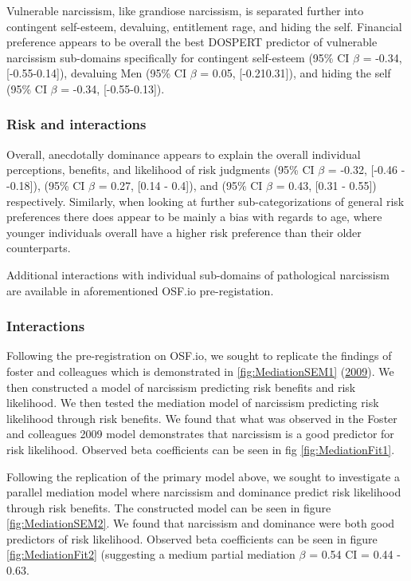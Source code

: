 \documentclass[
  donotrepeattitle,doc, 12pt, a4paper,floatsintext]{apa7}
\begin{document}
Vulnerable narcissism, like grandiose narcissism, is separated further into contingent self-esteem, devaluing, entitlement rage, and hiding the self. Financial preference appears to be overall the best DOSPERT predictor of vulnerable narcissism sub-domains specifically for contingent self-esteem (95\% CI \(\beta\) = -0.34, {[}-0.55-0.14{]}), devaluing Men (95\% CI \(\beta\) = 0.05, {[}-0.210.31{]}), and hiding the self (95\% CI \(\beta\) = -0.34, {[}-0.55-0.13{]}).

\hypertarget{risk-and-interactions}{%
\subsubsection{Risk and interactions}\label{risk-and-interactions}}

Overall, anecdotally dominance appears to explain the overall individual perceptions, benefits, and likelihood of risk judgments (95\% CI \(\beta\) = -0.32, {[}-0.46 - -0.18{]}), (95\% CI \(\beta\) = 0.27, {[}0.14 - 0.4{]}), and (95\% CI \(\beta\) = 0.43, {[}0.31 - 0.55{]}) respectively. Similarly, when looking at further sub-categorizations of general risk preferences there does appear to be mainly a bias with regards to age, where younger individuals overall have a higher risk preference than their older counterparts.

Additional interactions with individual sub-domains of pathological narcissism are available in aforementioned OSF.io pre-registation.

\hypertarget{interactions-1}{%
\subsubsection{Interactions}\label{interactions-1}}

Following the pre-registration on OSF.io, we sought to replicate the findings of foster and colleagues which is demonstrated in \ref{fig:MediationSEM1} (\protect\hyperlink{ref-foster2009}{2009}). We then constructed a model of narcissism predicting risk benefits and risk likelihood. We then tested the mediation model of narcissism predicting risk likelihood through risk benefits. We found that what was observed in the Foster and colleagues 2009 model demonstrates that narcissism is a good predictor for risk likelihood. Observed beta coefficients can be seen in fig \ref{fig:MediationFit1}.

Following the replication of the primary model above, we sought to investigate a parallel mediation model where narcissism and dominance predict risk likelihood through risk benefits. The constructed model can be seen in figure \ref{fig:MediationSEM2}. We found that narcissism and dominance were both good predictors of risk likelihood. Observed beta coefficients can be seen in figure \ref{fig:MediationFit2} (suggesting a medium partial mediation \(\beta\) = 0.54 CI = 0.44 - 0.63.
\end{document}
